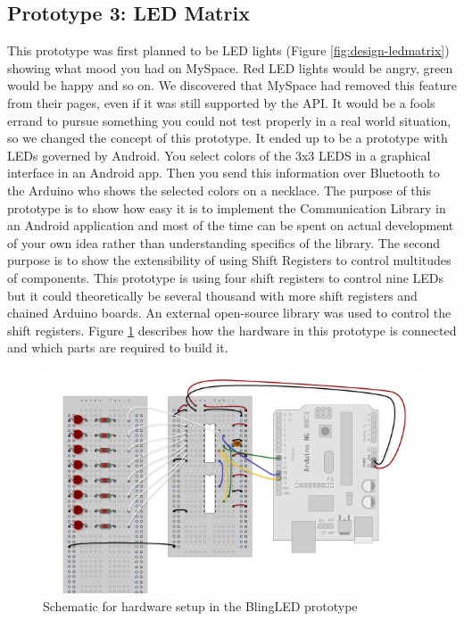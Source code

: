 \subsection{Prototype 3: LED Matrix} \label{section:prototype-led}
This prototype was first planned to be LED lights (Figure \ref{fig:design-ledmatrix}) showing what mood you had on MySpace.
Red LED lights would be angry, green would be happy and so on. We discovered that MySpace had removed this feature from their pages, even if it was still supported by the API. It would be a fools errand to pursue something you could not test properly
in a real world situation, so we changed the concept of this prototype. It ended up to be a prototype with LEDs governed by Android.
You select colors of the 3x3 LEDS in a graphical interface in an Android app. Then you send this information over Bluetooth
to the Arduino who shows the selected colors on a necklace.
The purpose of this prototype is to show how easy it is to implement the Communication Library in an Android application and most of the time can be spent on actual development of your own idea rather than understanding specifics of the library. The second purpose is to show the extensibility of using Shift Registers to control multitudes of components. This prototype is using four shift registers to control nine LEDs but it could theoretically be several thousand with more shift registers and chained Arduino boards. An external open-source library was used to control the shift registers\cite{link:shiftpwm}.  Figure \ref{fig:design-blingled-schematic} describes how the hardware in this prototype is connected and which parts are required to build it.

\begin{figure}[h!]
	\centering
	\includegraphics[scale=1.0]{img/blingled-schematic}
	\caption{Schematic for hardware setup in the BlingLED prototype}
	\label{fig:design-blingled-schematic}
\end{figure}


